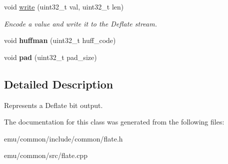 \begin{DoxyCompactItemize}
\mbox{\label{classeka2l1_1_1flate_1_1bit__output_aa84d3f76ea892678dbde158067dc4f8e}} 
void \mbox{\hyperlink{classeka2l1_1_1flate_1_1bit__output_aa84d3f76ea892678dbde158067dc4f8e}{write}} (uint32\+\_\+t val, uint32\+\_\+t len)
\begin{DoxyCompactList}\small\item\em Encode a value and write it to the Deflate stream. \end{DoxyCompactList}\item 
\mbox{\label{classeka2l1_1_1flate_1_1bit__output_a513427262b61a06f524bf58ed7c6fa68}} 
void {\bfseries huffman} (uint32\+\_\+t huff\+\_\+code)
\item 
\mbox{\label{classeka2l1_1_1flate_1_1bit__output_aff3f9fa5cb3bee3944ddbe48acd55db9}} 
void {\bfseries pad} (uint32\+\_\+t pad\+\_\+size)
\end{DoxyCompactItemize}


\subsection{Detailed Description}
Represents a Deflate bit output. 

The documentation for this class was generated from the following files\+:\begin{DoxyCompactItemize}
\item 
emu/common/include/common/flate.\+h\item 
emu/common/src/flate.\+cpp\end{DoxyCompactItemize}
